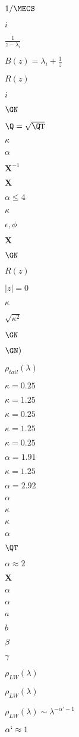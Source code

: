 $1/\MECS$

$i$

$\frac{1}{z-\lambda_{i}}$

$B(z)=\lambda_{i}+\frac{1}{z}$

$R(z)$

$i$

$\GN$

$\Q=\sqrt{\QT}$

$\kappa$

$\alpha$

$\mathbf{X}^{-1}$

$\mathbf{X}$

$\alpha\le 4$

$\kappa$

$\epsilon,\phi$

$\mathbf{X}$

$\GN$

$R(z)$

$|z|=0$

$\kappa$

$\sqrt{\kappa^{2}}$

$\GN$

$\GN)$

$\rho_{tail}(\lambda)$

$\kappa=0.25$

$\kappa=1.25$

$\kappa=0.25$

$\kappa=1.25$

$\kappa=0.25$

$\alpha=1.91$

$\kappa=1.25$

$\alpha=2.92$

$\alpha$

$\kappa$

$\kappa$

$\alpha$

$\QT$

$\alpha\approx 2$

$\mathbf{X}$

$\alpha$

$\alpha$

$a$

$b$

$\beta$

$\gamma$

$\rho_{LW}(\lambda)$

$\rho_{LW}(\lambda)$

$\rho_{LW}(\lambda)\sim\lambda^{-\alpha'-1}$

$\alpha`\approx 1$

